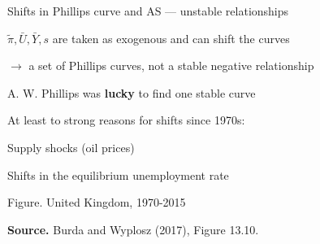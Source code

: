 \documentclass{beamer}
\newenvironment{mytemize}
{\vfill\itemize[nolistsep,itemsep=\fill,label=\color{blue}{$\triangleright$}]}
  {\enditemize}
\begin{document}
\begin{frame}{Shifts in Phillips curve and AS --- unstable relationships}

\begin{mytemize}
\item $\tilde{\pi},\bar{U},\bar{Y},s$ are taken as exogenous and can shift the curves
\item[$\rightarrow$] a set of Phillips curves, not a stable negative relationship
\item A. W. Phillips was \textbf{lucky} to find one stable curve
\item At least to strong reasons for shifts since 1970s:
\begin{mytemize}
\item Supply shocks (oil prices)
\item Shifts in the equilibrium unemployment rate
\end{mytemize}
\end{mytemize}
\begin{center}
{\tiny
Figure. United Kingdom, 1970-2015
}
\vspace{-3mm}
\begin{figure}[h!]
\end{figure}
\begin{minipage}{0.50\columnwidth}
\tiny	
\textbf{Source.} Burda and Wyplosz (2017), Figure 13.10.\\
\end{minipage}
\end{center}

\end{frame}
\end{document}
